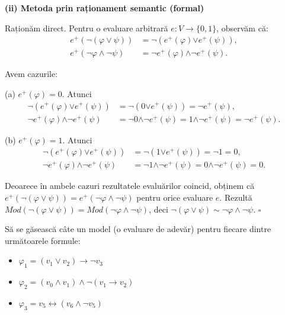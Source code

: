 \vspace{0.3cm}
\noindent \textbf{(ii) Metoda prin raționament semantic (formal)}

Raționăm direct. Pentru o evaluare arbitrară $e : V \to \{0,1\}$, observăm că:
\begin{align*}
	e^+(\neg(\varphi \lor \psi))    & = \bm{\neg} (e^+(\varphi) \bm{\lor} e^+(\psi)),          \\
	e^+(\neg\varphi \land \neg\psi) & = \bm{\neg} e^+(\varphi) \bm{\land} \bm{\neg} e^+(\psi).
\end{align*}

Avem cazurile:

(a) $e^+(\varphi) = 0$. Atunci
\begin{align*}
	\bm{\neg} (e^+(\varphi) \bm{\lor} e^+(\psi))          & = \bm{\neg} (0 \bm{\lor} e^+(\psi)) = \bm{\neg} e^+(\psi),                                             \\
	\bm{\neg} e^+(\varphi) \bm{\land} \bm{\neg} e^+(\psi) & = \bm{\neg} 0 \bm{\land} \bm{\neg} e^+(\psi) = 1 \bm{\land} \bm{\neg} e^+(\psi) = \bm{\neg} e^+(\psi).
\end{align*}

(b) $e^+(\varphi) = 1$. Atunci
\begin{align*}
	\bm{\neg} (e^+(\varphi) \bm{\lor} e^+(\psi))          & = \bm{\neg} (1 \bm{\lor} e^+(\psi)) = \bm{\neg} 1 = 0,                               \\
	\bm{\neg} e^+(\varphi) \bm{\land} \bm{\neg} e^+(\psi) & = \bm{\neg} 1 \bm{\land} \bm{\neg} e^+(\psi) = 0 \bm{\land} \bm{\neg} e^+(\psi) = 0.
\end{align*}

Deoarece în ambele cazuri rezultatele evaluărilor coincid, obținem că $e^+(\neg(\varphi \lor \psi)) = e^+(\neg\varphi \land \neg\psi)$ pentru orice evaluare $e$. Rezultă $Mod(\neg(\varphi \lor \psi)) = Mod(\neg\varphi \land \neg\psi)$, deci $\neg(\varphi \lor \psi) \sim \neg\varphi \land \neg\psi$.
\hfill $\square$


\begin{ex}
	Să se găsească câte un model (o evaluare de adevăr) pentru fiecare dintre următoarele formule:
	\begin{itemize}
		\item[(i)] $\varphi_1 = (v_1 \vee v_2) \to \neg v_3$
		\item[(ii)] $\varphi_2 = (v_0 \wedge v_1) \wedge \neg(v_1 \to v_2)$
		\item[(iii)] $\varphi_3 = v_5 \leftrightarrow (v_6 \wedge \neg v_5)$
	\end{itemize}
\end{ex}

